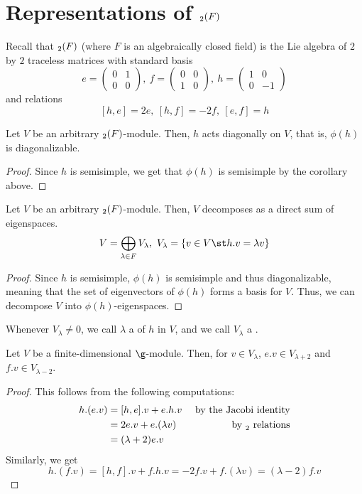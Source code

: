 \documentclass[11pt,leqno,oneside]{amsart}
\numberwithin{thm}{section}
\begin{document}
\section{Representations of \(\sl_2(F)\)}
Recall that \(\sl_2(F)\) (where \(F\) is an algebraically closed
field) is the Lie algebra of \(2\) by \(2\)
traceless matrices with standard basis \[
  e = \left(
    \begin{array}{cc}
      0&1\\
      0&0
    \end{array}
\right), \ f = \left(
  \begin{array}{cc}
    0&0\\
    1&0
  \end{array}
\right), \ h = \left(
  \begin{array}{cc}
    1&0\\
    0&-1
  \end{array}
\right)
\]
and relations \[
  [h,e] = 2e, \ [h,f] = -2f, \ [e,f] = h
\]
\begin{prop}
  Let \(V\) be an arbitrary \(\sl_2(F)\)-module. Then, \(h\) acts
  diagonally on \(V\), that is, \(\phi(h)\) is diagonalizable.
\end{prop}
\begin{proof}
  Since \(h\) is semisimple, we get that \(\phi(h)\) is semisimple by
  the corollary above.
\end{proof}
\begin{prop}
  Let \(V\) be an arbitrary \(\sl_2(F)\)-module. Then, \(V\)
  decomposes as a direct sum of eigenspaces. \[
    V = \bigoplus_{\lambda \in F} V_\lambda, \ V_\lambda = \{v \in V \st h.v
    = \lambda v\}
  \]
\end{prop}
\begin{proof}
  Since \(h\) is semisimple, \(\phi(h)\) is semisimple and thus
  diagonalizable, meaning that the set of eigenvectors of \(\phi(h)\)
  forms a basis for \(V\). Thus, we can decompose \(V\) into
  \(\phi(h)\)-eigenspaces. 
\end{proof}
\begin{defn}
  Whenever \(V_\lambda \neq 0\), we call \(\lambda\) a  of
  \(h\) in \(V\), and we call \(V_\lambda\) a .
\end{defn}
\begin{lem}
  Let \(V\) be a finite-dimensional \(\g\)-module. Then, for \(v \in
  V_\lambda\), \(e.v \in V_{\lambda+2}\) and \(f.v \in V_{\lambda-2}\).
\end{lem}
\begin{proof}
  This follows from the following computations:
  \begin{align*}
        h.(e.v) & = [h,e].v + e.h.v & \text{ by the Jacobi identity}
    \\
                & = 2e.v + e.(\lambda v) & \text{ by }\sl_2\text{ relations} \\
                & = (\lambda+2)e.v
  \end{align*}
  Similarly, we get \[
    h.(f.v) = [h,f].v + f.h.v = -2f.v + f.(\lambda v) = (\lambda-2)f.v
  \]
\end{proof}
\end{document}
